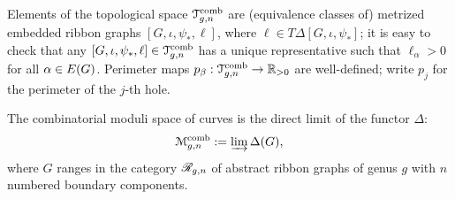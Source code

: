 Elements of the topological space $\mathcal{T}\sp{\text{comb}}_{g,n}$ are (equivalence
classes of) metrized embedded ribbon graphs $[G, \iota, \psi_*, \ell]$, where $\ell
\in T\Delta[G, \iota, \psi_*]$; it is easy to check that any $[G, \iota, \psi_*, \ell] \in
\mathcal{T}\sp{\text{comb}}_{g,n}$ has a unique representative such that $\ell_\alpha > 0$ for all
$\alpha \in E(G)$.  Perimeter maps $p_\beta: \mathcal{T}\sp{\text{comb}}_{g,n} \to \mathbb{R}_{>0}$ are
well-defined; write $p_j$ for the perimeter of the $j$-th hole.

\begin{definition}
  The combinatorial moduli space of curves is the direct limit of the
  functor $\Delta$:
  \begin{equation*}
    \mathcal{M}\sp{\text{comb}}_{g,n} := \varinjlim \Delta(G),
  \end{equation*}
  where $G$ ranges in the category $\mathscr{R}_{g,n}$ of abstract ribbon
  graphs of genus $g$ with $n$ numbered boundary components.
\end{definition}

